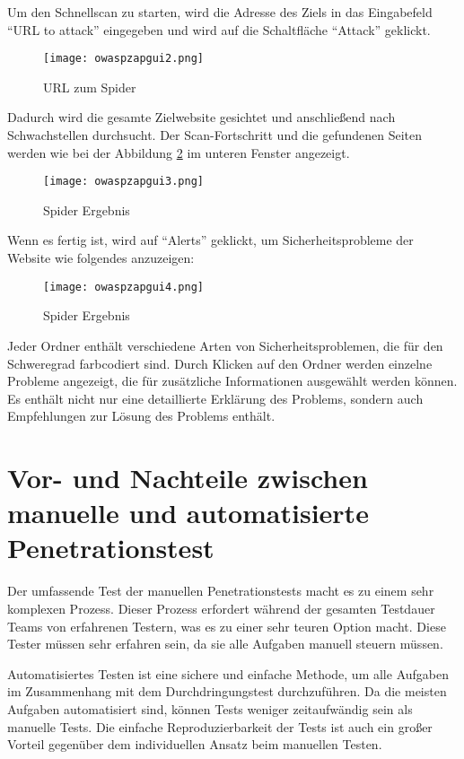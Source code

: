 Um den Schnellscan zu starten, wird die Adresse des Ziels in das Eingabefeld "`URL to attack"' eingegeben und wird auf die Schaltfläche "`Attack"' geklickt.

\begin{figure}[h]
	\centering
	\texttt{[image: owaspzapgui2.png]}
	\caption{URL zum Spider}
	\label{quickscan2}
\end{figure}

Dadurch wird die gesamte Zielwebsite gesichtet und anschließend nach Schwachstellen durchsucht. Der Scan-Fortschritt und die gefundenen Seiten werden wie bei der Abbildung \ref{quickscan3} im unteren Fenster angezeigt.

\begin{figure}[h]
	\centering
	\texttt{[image: owaspzapgui3.png]}
	\caption{Spider Ergebnis}
	\label{quickscan3}
\end{figure}

Wenn es fertig ist, wird auf "`Alerts"' geklickt, um Sicherheitsprobleme der Website wie folgendes anzuzeigen:

\begin{figure}[h]
	\centering
	\texttt{[image: owaspzapgui4.png]}
	\caption{Spider Ergebnis}
	\label{quickscan4}
\end{figure}

Jeder Ordner enthält verschiedene Arten von Sicherheitsproblemen, die für den Schweregrad farbcodiert sind. Durch Klicken auf den Ordner werden einzelne Probleme angezeigt, die für zusätzliche Informationen ausgewählt werden können. Es enthält nicht nur eine detaillierte Erklärung des Problems, sondern auch Empfehlungen zur Lösung des Problems enthält.

\section{Vor- und Nachteile zwischen manuelle und automatisierte Penetrationstest}

Der umfassende Test der manuellen Penetrationstests macht es zu einem sehr komplexen Prozess. Dieser Prozess erfordert während der gesamten Testdauer Teams von erfahrenen Testern, was es zu einer sehr teuren Option macht. Diese Tester müssen sehr erfahren sein, da sie alle Aufgaben manuell steuern müssen.

Automatisiertes Testen ist eine sichere und einfache Methode, um alle Aufgaben im Zusammenhang mit dem Durchdringungstest durchzuführen. Da die meisten Aufgaben automatisiert sind, können Tests weniger zeitaufwändig sein als manuelle Tests. Die einfache Reproduzierbarkeit der Tests ist auch ein großer Vorteil gegenüber dem individuellen Ansatz beim manuellen Testen.






